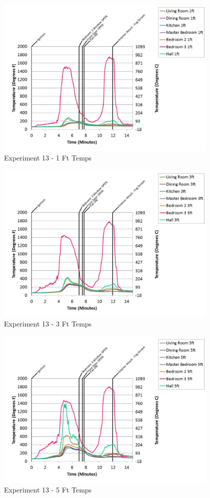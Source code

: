\documentclass{article}
\begin{document}
\begin{appendices}
	\begin{figure}[h!]
		\centering
		\includegraphics[height=3.05in]{0_Images/Results_Charts/Exp_13_Charts/1FtTemps.pdf}
		\caption{Experiment 13 - 1 Ft Temps}
	\end{figure}
 

	\begin{figure}[h!]
		\centering
		\includegraphics[height=3.05in]{0_Images/Results_Charts/Exp_13_Charts/3FtTemps.pdf}
		\caption{Experiment 13 - 3 Ft Temps}
	\end{figure}
 
	\clearpage

	\begin{figure}[h!]
		\centering
		\includegraphics[height=3.05in]{0_Images/Results_Charts/Exp_13_Charts/5FtTemps.pdf}
		\caption{Experiment 13 - 5 Ft Temps}
	\end{figure}
 


\end{appendices}
\end{document}
